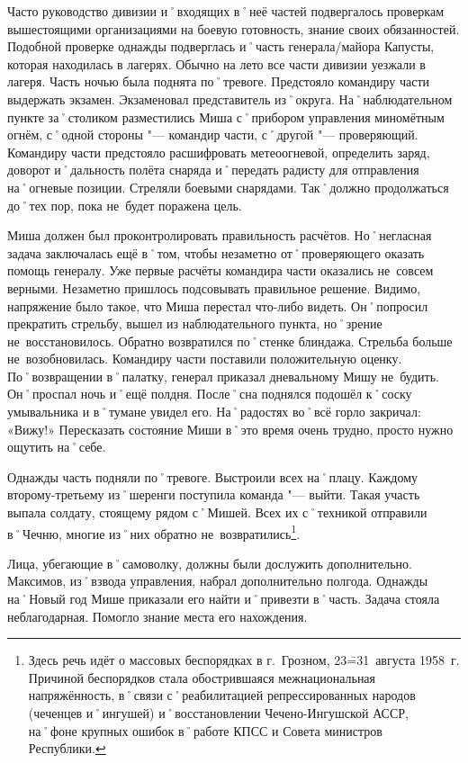 Часто руководство дивизии и˚входящих в˚неё частей подвергалось проверкам вышестоящими организациями на боевую готовность, знание своих обязанностей. Подобной проверке однажды подверглась и˚часть генерала\-/майора Капусты, которая находилась в лагерях. Обычно на лето все части дивизии уезжали в лагеря. Часть ночью была поднята по˚тревоге. Предстояло командиру части выдержать экзамен. Экзаменовал представитель из˚округа. На˚наблюдательном пункте за˚столиком разместились Миша с˚прибором управления миномётным огнём, с˚одной стороны "--- командир части, с˚другой "--- проверяющий. Командиру части предстояло расшифровать метеоогневой, определить заряд, доворот и˚дальность полёта снаряда и˚передать радисту для отправления на˚огневые позиции. Стреляли боевыми снарядами. Так˚должно продолжаться до˚тех пор, пока не~будет поражена цель.

Миша должен был проконтролировать правильность расчётов. Но˚негласная задача заключалась ещё в˚том, чтобы незаметно от˚проверяющего оказать помощь генералу. Уже первые расчёты командира части оказались не~совсем верными. Незаметно пришлось подсовывать правильное решение. Видимо, напряжение было такое, что Миша перестал что-либо видеть. Он˚попросил прекратить стрельбу, вышел из наблюдательного пункта, но˚зрение не~восстановилось. Обратно возвратился по˚стенке блиндажа. Стрельба больше не~возобновилась. Командиру части поставили положительную оценку. По˚возвращении в˚палатку, генерал приказал дневальному Мишу не~будить. Он˚проспал ночь и˚ещё полдня. После˚сна поднялся подошёл к˚соску умывальника и в˚тумане увидел его. На˚радостях во˚всё горло закричал: «Вижу!» Пересказать состояние Миши в˚это время очень трудно, просто нужно ощутить на˚себе.

Однажды часть подняли по˚тревоге. Выстроили всех на˚плацу. Каждому второму\--третьему из˚шеренги поступила команда "--- выйти. Такая участь выпала солдату, стоящему рядом с˚Мишей. Всех их с˚техникой отправили в˚Чечню, многие из˚них обратно не~возвратились\footnote
{Здесь речь идёт о массовых беспорядках в г.~Грозном, 23\==31~августа 1958~г. Причиной беспорядков стала обострившаяся межнациональная напряжённость, в˚связи с˚реабилитацией репрессированных народов (чеченцев и˚ингушей) и˚восстановлении Чечено-Ингушской АССР, на˚фоне крупных ошибок в˚работе КПСС и Совета министров Республики.}. 

Лица, убегающие в˚самоволку, должны были дослужить дополнительно. Максимов, из˚взвода управления, набрал дополнительно полгода. Однажды на˚Новый год Мише приказали его найти и˚привезти в˚часть. Задача стояла неблагодарная. Помогло знание места его нахождения. 

